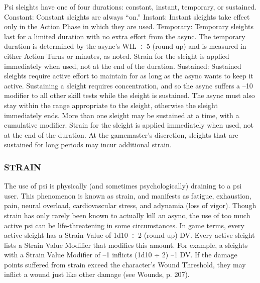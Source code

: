Psi sleights have one of four durations: constant, instant,
temporary, or sustained.
Constant: Constant sleights are always “on.”
Instant: Instant sleights take effect only in the
Action Phase in which they are used.
Temporary: Temporary sleights last for a limited
duration with no extra effort from the async. The
temporary duration is determined by the async’s WIL
$\div$ 5 (round up) and is measured in either Action Turns
or minutes, as noted. Strain for the sleight is applied
immediately when used, not at the end of the duration.
Sustained: Sustained sleights require active effort
to maintain for as long as the async wants to keep
it active. Sustaining a sleight requires concentration,
and so the async suffers a –10 modifier to all other
skill tests while the sleight is sustained. The async
must also stay within the range appropriate to the
sleight, otherwise the sleight immediately ends. More
than one sleight may be sustained at a time, with a
cumulative modifier. Strain for the sleight is applied
immediately when used, not at the end of the duration.
At the gamemaster’s discretion, sleights that are
sustained for long periods may incur additional strain.

\subsubsection{STRAIN}

The use of psi is physically (and sometimes psychologically)
draining to a psi user. This phenomenon is
known as strain, and manifests as fatigue, exhaustion,
pain, neural overload, cardiovascular stress, and
adynamia (loss of vigor). Though strain has only
rarely been known to actually kill an async, the use
of too much active psi can be life-threatening in some
circumstances.
In game terms, every active sleight has a Strain
Value of 1d10 $\div$ 2 (round up) DV. Every active sleight
lists a Strain Value Modifier that modifies this amount.
For example, a sleights with a Strain Value Modifier
of –1 inflicts (1d10 $\div$ 2) –1 DV.
If the damage points suffered from strain exceed
the character’s Wound Threshold, they may inflict a
wound just like other damage (see Wounds, p. 207).

